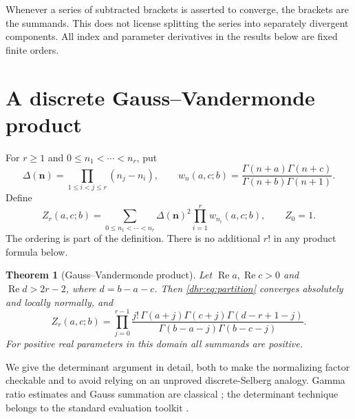 \documentclass[11pt,letterpaper]{article}
\numberwithin{equation}{section}
\newtheorem{theorem}{Theorem}[section]
\theoremstyle{definition}\newtheorem{definition}[theorem]{Definition}
\theoremstyle{remark}\newtheorem{remark}[theorem]{Remark}
\DeclareMathOperator{\Rea}{Re}
\begin{document}
Whenever a series of subtracted brackets is asserted to converge,
the brackets are the summands. This does not license splitting the
series into separately divergent components. All index and parameter
derivatives in the results below are fixed finite orders.


\section{A discrete Gauss--Vandermonde product}
\label{dhr:sec:determinant}

For $r\geq1$ and $0\leq n_1<\cdots<n_r$, put
\[
 \Delta(\bm n)=\prod_{1\leq i<j\leq r}(n_j-n_i),\qquad
 w_n(a,c;b)=\frac{\Gamma(n+a)\Gamma(n+c)}
 {\Gamma(n+b)\Gamma(n+1)}.
\]
Define
\begin{equation}\label{dhr:eq:partition}
 Z_r(a,c;b)=\sum_{0\leq n_1<\cdots<n_r}
       \Delta(\bm n)^2\prod_{i=1}^r w_{n_i}(a,c;b),
 \qquad Z_0=1.
\end{equation}
The ordering is part of the definition. There is no additional $r!$
in any product formula below.

\begin{theorem}[Gauss--Vandermonde product]\label{dhr:thm:gauss}
Let $\Rea a,\Rea c>0$ and $\Rea d>2r-2$, where $d=b-a-c$.
Then \eqref{dhr:eq:partition} converges absolutely and locally normally,
and
\begin{equation}\label{dhr:eq:gauss-product}
 \boxed{\displaystyle
 Z_r(a,c;b)=\prod_{j=0}^{r-1}
 \frac{j!\,\Gamma(a+j)\Gamma(c+j)\Gamma(d-r+1-j)}
 {\Gamma(b-a-j)\Gamma(b-c-j)}.}
\end{equation}
For positive real parameters in this domain all summands are positive.
\end{theorem}

We give the determinant argument in detail, both to make the normalizing
factor checkable and to avoid relying on an unproved discrete-Selberg
analogy. Gamma ratio estimates and Gauss summation are classical
\cite{dlmf:gamma,dlmf:gauss}; the determinant technique belongs to the
standard evaluation toolkit \cite{krattenthaler}.
\end{document}
